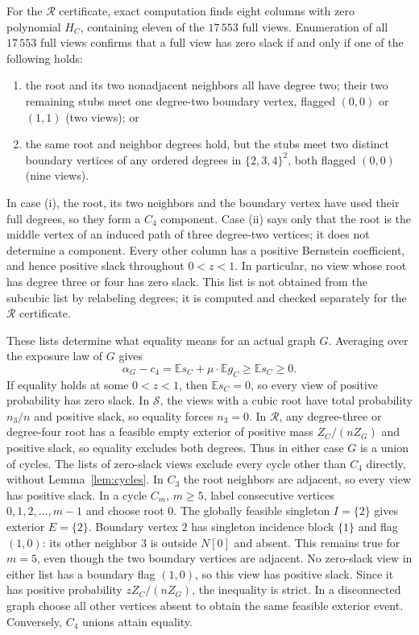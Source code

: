\documentclass[11pt]{article}
\newcommand{\E}{\mathbb E}\newcommand{\Prob}{\mathbb P}
\begin{document}
For the $\mathcal R$ certificate, exact computation finds eight columns with zero polynomial $H_C$, containing eleven of the $17\,553$ full views. Enumeration of all $17\,553$ full views confirms that a full view has zero slack if and only if one of the following holds:
\begin{enumerate}[label=(\roman*),itemsep=2pt]
\item the root and its two nonadjacent neighbors all have degree two; their two remaining stubs meet one degree-two boundary vertex, flagged $(0,0)$ or $(1,1)$ (two views); or
\item the same root and neighbor degrees hold, but the stubs meet two distinct boundary vertices of any ordered degrees in $\{2,3,4\}^2$, both flagged $(0,0)$ (nine views).
\end{enumerate}
In case (i), the root, its two neighbors and the boundary vertex have used their full degrees, so they form a $C_4$ component. Case (ii) says only that the root is the middle vertex of an induced path of three degree-two vertices; it does not determine a component. Every other column has a positive Bernstein coefficient, and hence positive slack throughout $0<z<1$. In particular, no view whose root has degree three or four has zero slack. This list is not obtained from the subcubic list by relabeling degrees; it is computed and checked separately for the $\mathcal R$ certificate.

These lists determine what equality means for an actual graph $G$. Averaging over the exposure law of $G$ gives
\[
 \alpha_G-c_4=\E s_C+\mu\cdot\E g_C\ge\E s_C\ge0.
\]
If equality holds at some $0<z<1$, then $\E s_C=0$, so every view of positive probability has zero slack. In $\mathcal S$, the views with a cubic root have total probability $n_3/n$ and positive slack, so equality forces $n_3=0$. In $\mathcal R$, any degree-three or degree-four root has a feasible empty exterior of positive mass $Z_C/(nZ_G)$ and positive slack, so equality excludes both degrees. Thus in either case $G$ is a union of cycles. The lists of zero-slack views exclude every cycle other than $C_4$ directly, without Lemma~\ref{lem:cycles}. In $C_3$ the root neighbors are adjacent, so every view has positive slack. In a cycle $C_m$, $m\ge5$, label consecutive vertices $0,1,2,\ldots,m-1$ and choose root $0$. The globally feasible singleton $I=\{2\}$ gives exterior $E=\{2\}$. Boundary vertex $2$ has singleton incidence block $\{1\}$ and flag $(1,0)$: its other neighbor $3$ is outside $N[0]$ and absent. This remains true for $m=5$, even though the two boundary vertices are adjacent. No zero-slack view in either list has a boundary flag $(1,0)$, so this view has positive slack. Since it has positive probability $zZ_C/(nZ_G)$, the inequality is strict. In a disconnected graph choose all other vertices absent to obtain the same feasible exterior event. Conversely, $C_4$ unions attain equality. 
\end{document}
